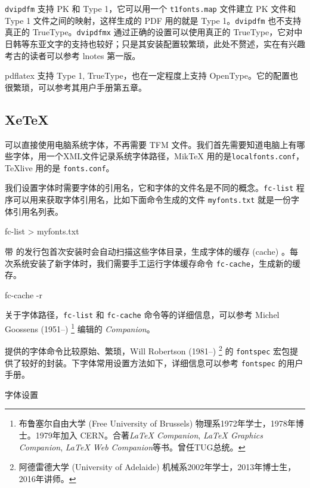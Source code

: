 \texttt{dvipdfm} 支持 PK 和 Type 1，它可以用一个 \texttt{t1fonts.map} 文件建立 PK 文件和 Type 1 文件之间的映射，这样生成的 PDF 用的就是 Type 1。\texttt{dvipdfm} 也不支持真正的 TrueType。\texttt{dvipdfmx} 通过正确的设置可以使用真正的 TrueType，它对中日韩等东亚文字的支持也较好；只是其安装配置较繁琐，此处不赘述，实在有兴趣考古的读者可以参考 lnotes 第一版\citep{Huang_lnotes}。

pdflatex 支持 Type 1, TrueType，也在一定程度上支持 OpenType。它的配置也很繁琐，可以参考其用户手册\citep{Han_pdftex}第五章。

\subsection{XeTeX}

\XeTeX 可以直接使用电脑系统字体，不再需要 TFM 文件。我们首先需要知道电脑上有哪些字体，\XeTeX 用一个XML文件记录系统字体路径，MikTeX 用的是\texttt{localfonts.conf}，TeXlive 用的是 \texttt{fonts.conf}。

我们设置字体时需要字体的引用名，它和字体的文件名是不同的概念。\texttt{fc-list} 程序可以用来获取字体引用名，比如下面命令生成的文件 \texttt{myfonts.txt} 就是一份字体引用名列表。

\begin{Code}[]
fc-list > myfonts.txt
\end{Code}

带 \XeTeX 的发行包首次安装时会自动扫描这些字体目录，生成字体的缓存 (cache) 。每次系统安装了新字体时，我们需要手工运行字体缓存命令 \texttt{fc-cache}，生成新的缓存。

\begin{Code}[]
fc-cache -r
\end{Code}

关于字体路径，\texttt{fc-list} 和 \texttt{fc-cache} 命令等的详细信息，可以参考 Michel Goossens (1951--)\indexGoossens{} \footnote{布鲁塞尔自由大学 (Free University of Brussels) 物理系1972年学士，1978年博士。1979年加入 CERN。合著\emph{\LaTeX{} Companion}, \emph{\LaTeX{} Graphics Companion}, \emph{\LaTeX{} Web Companion}等书。曾任TUG总统。} 编辑的\emph{\XeTeX{} Companion}\citep{Goossens_xetex}。

\XeTeX 提供的字体命令比较原始、繁琐，Will Robertson (1981--)\indexRobertson{} \footnote{阿德雷德大学 (University of Adelaide) 机械系2002年学士，2013年博士生，2016年讲师。} 的 \texttt{fontspec} 宏包提供了较好的封装。\XeLaTeX 下字体常用设置方法如下，详细信息可以参考 \texttt{fontspec} 的用户手册\citep{Robertson_fontspec}。

\begin{example}[h]
\begin{Code}[]
\usepackage{fontspec}
\setmainfont[Mapping=tex-text]{Times New Roman}
\setsansfont[Mapping=tex-text]{Tahoma}
\setmonofont{Courier New}
\end{Code}
\caption{\XeLaTeX 字体设置}
\label{exa:xelatex_font}
\end{example}

